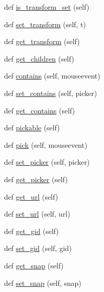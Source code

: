 \begin{DoxyCompactItemize}
\item 
def \hyperlink{classmatplotlib_1_1artist_1_1Artist_acdf01ea328fa4a255021e47ee118f6aa}{is\+\_\+transform\+\_\+set} (self)
\item 
def \hyperlink{classmatplotlib_1_1artist_1_1Artist_aec2c42392658168f02e7c646583e6cb8}{set\+\_\+transform} (self, t)
\item 
def \hyperlink{classmatplotlib_1_1artist_1_1Artist_a36f2b843b163d554fccc6db802d85fbb}{get\+\_\+transform} (self)
\item 
def \hyperlink{classmatplotlib_1_1artist_1_1Artist_afae11801ae8a4f78d3cf8a50b2ccbc7c}{get\+\_\+children} (self)
\item 
def \hyperlink{classmatplotlib_1_1artist_1_1Artist_a0147afb4ab2383f87c613a8790df3448}{contains} (self, mouseevent)
\item 
def \hyperlink{classmatplotlib_1_1artist_1_1Artist_a0be165ab75ac3fa55a3904b3b6823685}{set\+\_\+contains} (self, picker)
\item 
def \hyperlink{classmatplotlib_1_1artist_1_1Artist_ad2a70315f56dbc0b73e5b5e7e2be530e}{get\+\_\+contains} (self)
\item 
def \hyperlink{classmatplotlib_1_1artist_1_1Artist_ae9bba514ddae38443dce4ad612568489}{pickable} (self)
\item 
def \hyperlink{classmatplotlib_1_1artist_1_1Artist_a9f4fb435d6223d31c50aa5935a655dd3}{pick} (self, mouseevent)
\item 
def \hyperlink{classmatplotlib_1_1artist_1_1Artist_a6d3ce39f1c84b99e061efe1255ec75d8}{set\+\_\+picker} (self, picker)
\item 
def \hyperlink{classmatplotlib_1_1artist_1_1Artist_a869f9ace9978fa8c036d4f10c1c25b63}{get\+\_\+picker} (self)
\item 
def \hyperlink{classmatplotlib_1_1artist_1_1Artist_ada41c54aa320ab4ea8d9b4dfeb8a16a9}{get\+\_\+url} (self)
\item 
def \hyperlink{classmatplotlib_1_1artist_1_1Artist_a7f5545703c7924342521b5b8d131f944}{set\+\_\+url} (self, url)
\item 
def \hyperlink{classmatplotlib_1_1artist_1_1Artist_a445dd71c5287e4e70f31012216803ff8}{get\+\_\+gid} (self)
\item 
def \hyperlink{classmatplotlib_1_1artist_1_1Artist_aa9f9956c2e5ed3fb357779b7cd66898f}{set\+\_\+gid} (self, gid)
\item 
def \hyperlink{classmatplotlib_1_1artist_1_1Artist_a0f1f927f7a9111bb1befa1ba633885e2}{get\+\_\+snap} (self)
\item 
def \hyperlink{classmatplotlib_1_1artist_1_1Artist_a33a0c3664686bd82867ea9081fb50dd3}{set\+\_\+snap} (self, snap)

\end{DoxyCompactItemize}
